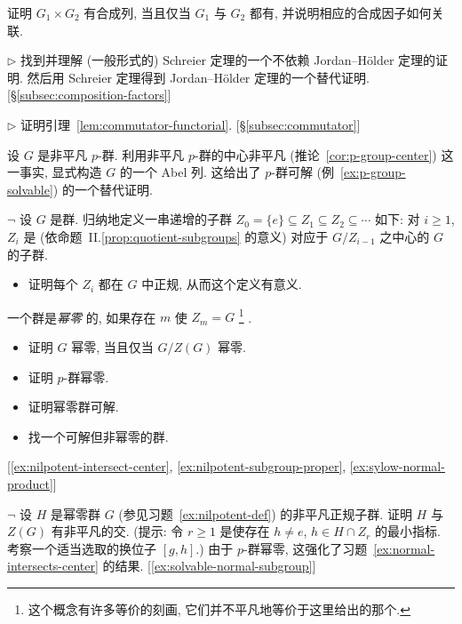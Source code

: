 \begin{prob}
\label{ex:product-composition}
证明 $G_1 \times G_2$ 有合成列, 当且仅当 $G_1$ 与 $G_2$ 都有, 并说明相应的合成因子如何关联.
\end{prob}

\begin{prob}
\label{ex:schreier}
$\triangleright$ 找到并理解 (一般形式的) Schreier 定理的一个不依赖 Jordan--H\"older 定理的证明. 然后用 Schreier 定理得到 Jordan--H\"older 定理的一个替代证明. [§\ref{subsec:composition-factors}]
\end{prob}

\begin{prob}
\label{ex:prove-lem-commutator}
$\triangleright$ 证明引理~\ref{lem:commutator-functorial}. [§\ref{subsec:commutator}]
\end{prob}

\begin{prob}
\label{ex:p-group-abelian-series}
设 $G$ 是非平凡 $p$-群. 利用非平凡 $p$-群的中心非平凡 (推论~\ref{cor:p-group-center}) 这一事实, 显式构造 $G$ 的一个 Abel 列. 这给出了 $p$-群可解 (例~\ref{ex:p-group-solvable}) 的一个替代证明.
\end{prob}

\begin{prob}
\label{ex:nilpotent-def}
$\neg$ 设 $G$ 是群. 归纳地定义一串递增的子群 $Z_0 = \{e\} \subseteq Z_1 \subseteq Z_2 \subseteq \cdots$ 如下: 对 $i \geq 1$, $Z_i$ 是 (依命题~II.\ref{prop:quotient-subgroups} 的意义) 对应于 $G/Z_{i-1}$ 之中心的 $G$ 的子群.
\begin{itemize}
\item 证明每个 $Z_i$ 都在 $G$ 中正规, 从而这个定义有意义.
\end{itemize}
一个群是\emph{幂零}%
%
的, 如果存在 $m$ 使 $Z_m = G$%
\footnote{这个概念有许多等价的刻画, 它们并不平凡地等价于这里给出的那个.}%
.
\begin{itemize}
\item 证明 $G$ 幂零, 当且仅当 $G/Z(G)$ 幂零.
\item 证明 $p$-群幂零.
\item 证明幂零群可解.
\item 找一个可解但非幂零的群.
\end{itemize}
[\ref{ex:nilpotent-intersect-center}, \ref{ex:nilpotent-subgroup-proper}, \ref{ex:sylow-normal-product}]
\end{prob}

\begin{prob}
\label{ex:nilpotent-intersect-center}
$\neg$ 设 $H$ 是幂零群 $G$ (参见习题~\ref{ex:nilpotent-def}) 的非平凡正规子群. 证明 $H$ 与 $Z(G)$ 有非平凡的交. (提示: 令 $r \geq 1$ 是使存在 $h \neq e$, $h \in H \cap Z_r$ 的最小指标. 考察一个适当选取的换位子 $[g, h]$.) 由于 $p$-群幂零, 这强化了习题~\ref{ex:normal-intersects-center} 的结果. [\ref{ex:solvable-normal-subgroup}]
\end{prob}

